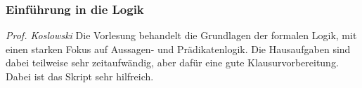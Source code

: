 
\subsubsection{Einführung in die Logik}
	\textit{Prof. Koslowski}
	Die Vorlesung behandelt die Grundlagen der formalen Logik, mit einen starken Fokus auf Aussagen- und Prädikatenlogik. Die Hausaufgaben sind dabei teilweise sehr zeitaufwändig, aber dafür eine gute Klausurvorbereitung. Dabei ist das Skript sehr hilfreich.